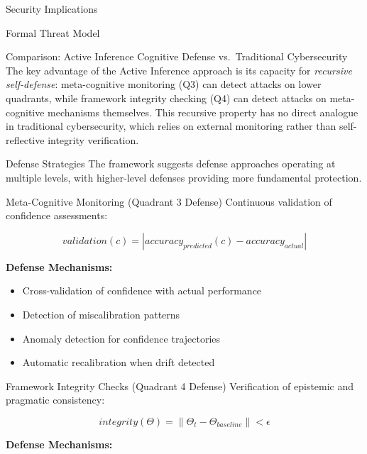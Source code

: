 \documentclass[
  ignorenonframetext,
]{beamer}
\providecommand{\tightlist}{%
  \setlength{\itemsep}{0pt}\setlength{\parskip}{0pt}}
\begin{document}
\begin{frame}{Security Implications}
\begin{block}{Formal Threat Model}
\begin{block}{Comparison: Active Inference Cognitive Defense
vs.~Traditional Cybersecurity}
The key advantage of the Active Inference approach is its capacity for
\emph{recursive self-defense}: meta-cognitive monitoring (Q3) can detect
attacks on lower quadrants, while framework integrity checking (Q4) can
detect attacks on meta-cognitive mechanisms themselves. This recursive
property has no direct analogue in traditional cybersecurity, which
relies on external monitoring rather than self-reflective integrity
verification.
\end{block}
\end{block}

\begin{block}{Defense Strategies}
\protect{}\label{sec:defense_strategies}
The framework suggests defense approaches operating at multiple levels,
with higher-level defenses providing more fundamental protection.

\begin{block}{Meta-Cognitive Monitoring (Quadrant 3 Defense)}
\protect{}\label{meta-cognitive-monitoring-quadrant-3-defense}
Continuous validation of confidence assessments:

\begin{equation}
validation(c) = |accuracy_{predicted}(c) - accuracy_{actual}|
\label{eq:confidence_validation}
\end{equation}

\textbf{Defense Mechanisms:}

\begin{itemize}
\tightlist
\item
  Cross-validation of confidence with actual performance
\item
  Detection of miscalibration patterns
\item
  Anomaly detection for confidence trajectories
\item
  Automatic recalibration when drift detected
\end{itemize}
\end{block}

\begin{block}{Framework Integrity Checks (Quadrant 4 Defense)}
\protect{}\label{framework-integrity-checks-quadrant-4-defense}
Verification of epistemic and pragmatic consistency:

\begin{equation}
integrity(\Theta) = \|\Theta_t - \Theta_{baseline}\| < \epsilon
\label{eq:framework_integrity}
\end{equation}

\textbf{Defense Mechanisms:}


\end{block}
\end{block}
\end{frame}
\end{document}
